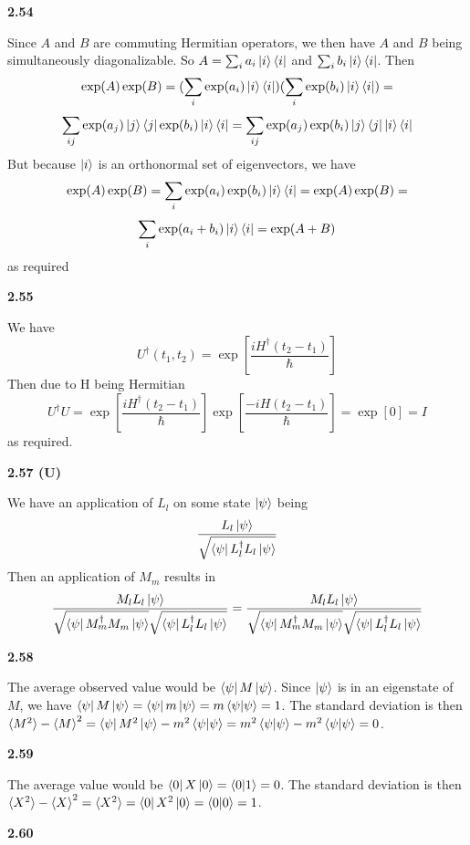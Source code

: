\textbf{2.54}

Since $ A$ and $B$ are commuting Hermitian operators, we then have $A$ and $B$ being simultaneously diagonalizable. So $ A = \sum_i a_i \ket{i}\bra{i}$ and $ \sum_i b_i \ket{i}\bra{i}$.
Then \[ \exp(A)\exp(B) = (\sum_i \exp(a_i) \ket{i}\bra{i})(\sum_i \exp(b_i) \ket{i}\bra{i})=\]\[\sum_{ij} \exp(a_j) \ket{j}\bra{j}\exp(b_i) \ket{i}\bra{i} =\sum_{ij} \exp(a_j)\exp(b_i) \ket{j}\bra{j}\ket{i}\bra{i}\]
But because $\ket{i}$ is an orthonormal set of eigenvectors, we have \[\exp(A)\exp(B) =\sum_{i} \exp(a_i)\exp(b_i)\ket{i}\bra{i} = \exp(A)\exp(B) =\]\[\sum_{i} \exp(a_i+b_i)\ket{i}\bra{i} = \exp(A+B)\] as required 

\textbf{2.55}

We have  \[U^\dag(t_1, t_2) = \exp\left[\frac{iH^\dag(t_2 - t_1)}{\hbar}\right]\]
Then due to H being Hermitian \[U^\dag U = \exp\left[\frac{iH^\dag(t_2 - t_1)}{\hbar}\right]\exp\left[\frac{-iH(t_2 - t_1)}{\hbar}\right] =\exp\left[0\right] = I\] as required. 

\textbf{2.57 (U)}

We have an application of $L_l$ on some state $\ket{\psi}$ being \[\frac{L_l\ket{\psi}}{\sqrt{\bra{\psi}L_l^\dag L_l\ket{\psi}}}\] Then an application of $ M_m$ results in \[\frac{M_lL_l\ket{\psi}}{\sqrt{\bra{\psi}M_m^\dag M_m\ket{\psi}}\sqrt{\bra{\psi}L_l^\dag L_l\ket{\psi}}} =\frac{M_lL_l\ket{\psi}}{\sqrt{\bra{\psi}M_m^\dag M_m\ket{\psi}}\sqrt{\bra{\psi}L_l^\dag L_l\ket{\psi}}} \]

\textbf{2.58}

The average observed value would be $ \bra{\psi}M \ket{\psi}$. Since $\ket{\psi}$ is in an eigenstate of $M$, we have $ \bra{\psi}M \ket{\psi} = \bra{\psi}m\ket{\psi} =  m\braket{\psi|\psi} = 1$. The standard deviation is then $ \braket{M^2} - \braket{M}^2 =\bra{\psi}M^2\ket{\psi}-m^2\braket{\psi|\psi} =m^2\braket{\psi |\psi}-m^2\braket{\psi|\psi} = 0$.

\textbf{2.59}

The average value would be $ \bra{0}X\ket{0} = \braket{0|1} = 0$. The standard deviation is then $\braket{X^2} - \braket{X}^2 =\braket{X^2} =  \bra{0}X^2\ket{0} = \braket{0|0} = 1$. 

\textbf{2.60}

